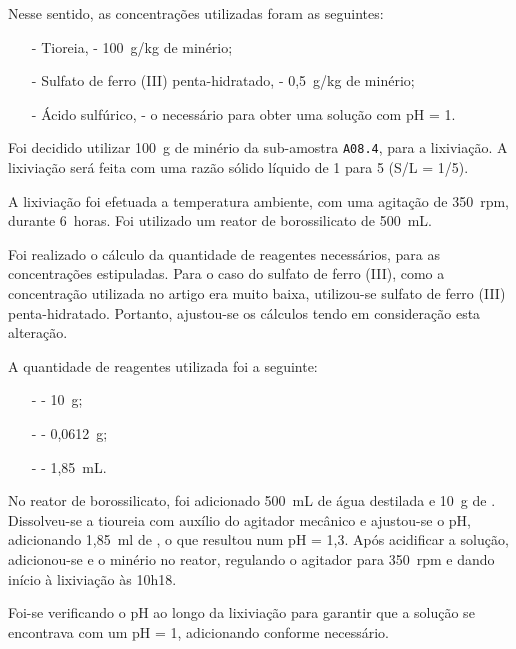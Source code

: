 Nesse sentido, as concentrações utilizadas foram as seguintes:
\begin{itemize}
    \item[-] Tioreia, \tioureia{} - 100~g/kg de minério;
    \item[-] Sulfato de ferro (III) penta-hidratado, \sulfe{} - 0,5~g/kg de minério;
    \item[-] Ácido sulfúrico, \acsul{} - o necessário para obter uma solução com pH = 1.
\end{itemize}

Foi decidido utilizar 100~g de minério da sub-amostra \texttt{A08.4}, para a lixiviação. 
A lixiviação será feita com uma razão sólido líquido de 1 para 5 (S/L = 1/5).

A lixiviação foi efetuada a temperatura ambiente, com uma agitação de 350~rpm, durante 6~horas.
Foi utilizado um reator de borossilicato de 500~mL.

Foi realizado o cálculo da quantidade de reagentes necessários, para as concentrações estipuladas. 
Para o caso do sulfato de ferro (III), como a concentração utilizada no artigo era muito baixa, utilizou-se sulfato de ferro (III) penta-hidratado. Portanto, ajustou-se os cálculos tendo em consideração esta alteração.

A quantidade de reagentes utilizada foi a seguinte:
\begin{itemize}
    \item[-] \tioureia{} - 10~g;
    \item[-] \sulfe{} - 0,0612~g;
    \item[-] \acsul{} - 1,85~mL.
\end{itemize}

No reator de borossilicato, foi adicionado 500~mL de água destilada e 10~g de \tioureia{}   .
Dissolveu-se a tioureia com auxílio do agitador mecânico e ajustou-se o pH, adicionando 1,85~ml de \acsul{}, o que resultou num pH = 1,3.
Após acidificar a solução, adicionou-se \sulfe{} e o minério no reator, regulando o agitador para 350~rpm e dando início à lixiviação às 10h18.

Foi-se verificando o pH ao longo da lixiviação para garantir que a solução se encontrava com um pH = 1, adicionando \acsul{} conforme necessário.

